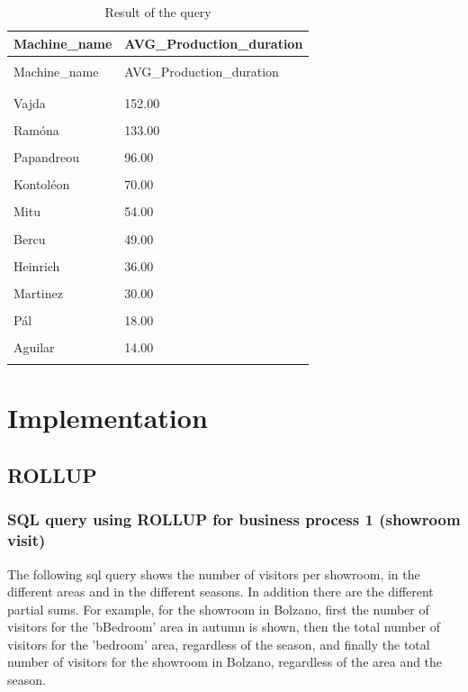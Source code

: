 \documentclass[letterpaper,12pt]{article}
\begin{document}
\begingroup
\renewcommand\arraystretch{0.5}
\begin{longtable}{p{3cm}p{4cm}}
        \caption{Result of the query} \\
        Machine\_name & AVG\_Production\_duration \\
        \endfirsthead \\
        Machine\_name & AVG\_Production\_duration \\
        \endhead \\
        \hline \\
        Vajda & 152.00 \\
        \hline \\
        \color{red} Ramóna & 133.00 \\
        \hline \\
        Papandreou & 96.00 \\
        \hline \\
        Kontoléon & 70.00 \\
        \hline \\
        Mitu & 54.00 \\
        \hline \\
        Bercu & 49.00 \\
        \hline \\
        Heinrich & 36.00 \\
        \hline \\
        Martinez & 30.00 \\
        \hline \\
        Pál & 18.00 \\
        \hline \\
        Aguilar & 14.00 \\
        \hline \\
\end{longtable} 
\endgroup

\section{Implementation}
\subsection{ROLLUP}
\subsubsection{SQL query using ROLLUP for business process 1 (showroom visit)}

The following sql query shows the number of visitors per showroom, in the different areas and in the different seasons. In addition there are the different partial sums. For example, for the showroom in Bolzano, first the number of visitors for the 'bBedroom' area in autumn is shown, then the total number of visitors for the 'bedroom' area, regardless of the season, and finally the total number of visitors for the showroom in Bolzano, regardless of the area and the season.
\end{document}
